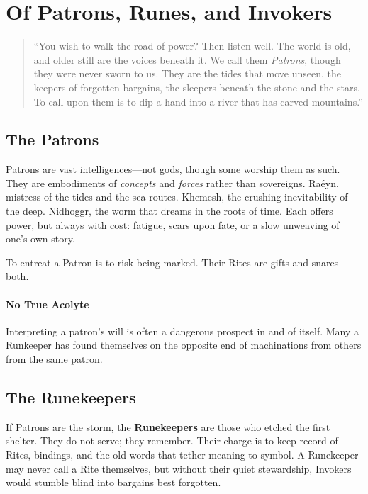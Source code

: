 \section{Of Patrons, Runes, and Invokers}
\label{sec:invoker-lore}

\begin{quote}
``You wish to walk the road of power? Then listen well. The world is old, and older still are the voices beneath it. We call them \textit{Patrons}, though they were never sworn to us. They are the tides that move unseen, the keepers of forgotten bargains, the sleepers beneath the stone and the stars. To call upon them is to dip a hand into a river that has carved mountains.''
\end{quote}

\subsection{The Patrons}

Patrons are vast intelligences---not gods, though some worship them as such. They are embodiments of \textit{concepts} and \textit{forces} rather than sovereigns. Raéyn, mistress of the tides and the sea-routes. Khemesh, the crushing inevitability of the deep. Nidhoggr, the worm that dreams in the roots of time. Each offers power, but always with cost: fatigue, scars upon fate, or a slow unweaving of one’s own story.

To entreat a Patron is to risk being marked. Their Rites are gifts and snares both.

\paragraph{No True Acolyte}
Interpreting a patron's will is often a dangerous prospect in and of itself. Many a Runkeeper has found themselves on the opposite end of machinations from others from the same patron.

\subsection{The Runekeepers}

If Patrons are the storm, the \textbf{Runekeepers} are those who etched the first shelter. They do not serve; they remember. Their charge is to keep record of Rites, bindings, and the old words that tether meaning to symbol. A Runekeeper may never call a Rite themselves, but without their quiet stewardship, Invokers would stumble blind into bargains best forgotten.

